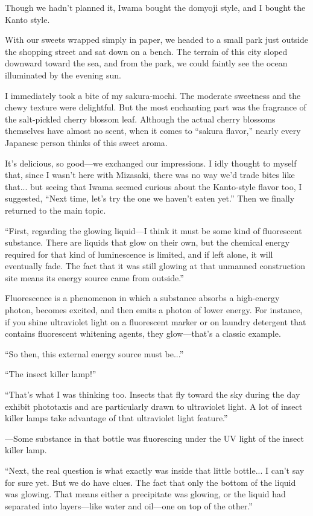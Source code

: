 \documentclass[
    a4paper,
    12pt,
    twoside,
    openany,
    UTF8,
    fontset=windows
]{ctexbook}
\begin{document}
Though we hadn't planned it, Iwama bought the domyoji style, and I bought the Kanto style.

With our sweets wrapped simply in paper, we headed to a small park just outside the shopping street and sat down on a bench. The terrain of this city sloped downward toward the sea, and from the park, we could faintly see the ocean illuminated by the evening sun.

I immediately took a bite of my sakura-mochi. The moderate sweetness and the chewy texture were delightful. But the most enchanting part was the fragrance of the salt-pickled cherry blossom leaf. Although the actual cherry blossoms themselves have almost no scent, when it comes to ``sakura flavor,'' nearly every Japanese person thinks of this sweet aroma.

It's delicious, so good---we exchanged our impressions. I idly thought to myself that, since I wasn't here with Mizasaki, there was no way we'd trade bites like that... but seeing that Iwama seemed curious about the Kanto-style flavor too, I suggested, ``Next time, let's try the one we haven't eaten yet.'' Then we finally returned to the main topic.

``First, regarding the glowing liquid---I think it must be some kind of fluorescent substance. There are liquids that glow on their own, but the chemical energy required for that kind of luminescence is limited, and if left alone, it will eventually fade. The fact that it was still glowing at that unmanned construction site means its energy source came from outside.''

Fluorescence is a phenomenon in which a substance absorbs a high-energy photon, becomes excited, and then emits a photon of lower energy. For instance, if you shine ultraviolet light on a fluorescent marker or on laundry detergent that contains fluorescent whitening agents, they glow---that's a classic example.

``So then, this external energy source must be...''

``The insect killer lamp!''

``That's what I was thinking too. Insects that fly toward the sky during the day exhibit phototaxis and are particularly drawn to ultraviolet light. A lot of insect killer lamps take advantage of that ultraviolet light feature.''

---Some substance in that bottle was fluorescing under the UV light of the insect killer lamp.

``Next, the real question is what exactly was inside that little bottle... I can't say for sure yet. But we do have clues. The fact that only the bottom of the liquid was glowing. That means either a precipitate was glowing, or the liquid had separated into layers---like water and oil---one on top of the other.''
\end{document}
